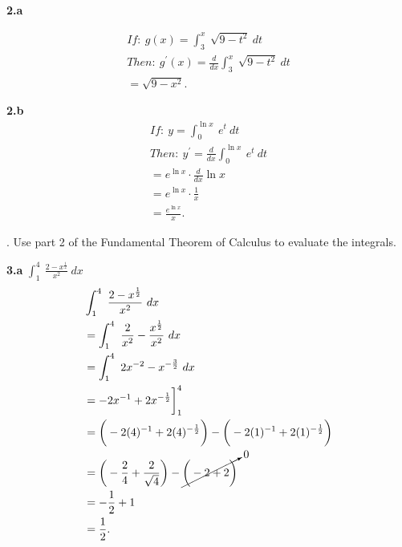 \documentclass{report}
\begin{document}
    \bigbreak \noindent 
    \textbf{2.a} 
    \bigbreak \noindent 
    
    \begin{align*}
        If:\ g(x) = \int_{3}^{x}\ \sqrt{9-t^{2}}\ dt \\
        Then:\ g^{\prime}(x) = \frac{d}{dx}\int_{3}^{x}\ \sqrt{9-t^{2}}\ dt \\
        =\sqrt{9-x^{2}}
    .\end{align*}

    \bigbreak \noindent 
    \textbf{2.b}
    \begin{align*}
        If:\ y = \int_{0}^{\ln{x}}\ e^{t}\ dt \\
        Then:\ y^{\prime} = \frac{d}{dx} \int_{0}^{\ln{x}}\ e^{t}\ dt \\
        = e^{\ln{x}} \cdot \frac{d}{dx}\ln{x} \\
        = e^{\ln{x}} \cdot \frac{1}{x} \\
        = \frac{e^{\ln{x}}}{x}
    .\end{align*}

    \pagebreak \bigbreak {}. Use part 2 of the Fundamental Theorem of Calculus to evaluate the integrals.

    \bigbreak \noindent 
    \textbf{3.a} $\int_{1}^{4}\ \frac{2-x^{\frac{1}{2}}}{x^{2}} \ dx $
    \begin{align*}
        &\int_{1}^{4}\ \frac{2-x^{\frac{1}{2}}}{x^{2}} \ dx  \\
        &= \int_{1}^{4}\ \frac{2}{x^{2}}-\frac{x^{\frac{1}{2}}}{x^{2}}\ dx \\
        &= \int_{1}^{4}\ 2x^{-2}-x^{-\frac{3}{2}}\ dx \\
        &= -2x^{-1} + 2x^{-\frac{1}{2}} \bigg]^{4}_1 \\
        &= \bigg(-2(4)^{-1}+2(4)^{-\frac{1}{2}}\bigg) - \bigg(-2(1)^{-1}+2(1)^{-\frac{1}{2}}\bigg) \\
        &= \bigg(-\frac{2}{4} + \frac{2}{\sqrt{4}}\bigg) - \cancelto{0}{\bigg(-2 + 2\bigg)} \\
        &= -\frac{1}{2}+1 \\
        &=\frac{1}{2}
    .\end{align*}
\end{document}
